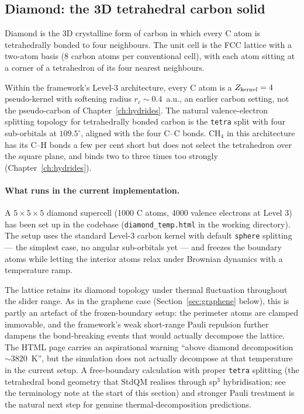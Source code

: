 \subsection{Diamond: the 3D tetrahedral carbon solid}

Diamond is the 3D crystalline form of carbon in which every C atom is tetrahedrally bonded to four neighbours. The unit cell is the FCC lattice with a two-atom basis (8 carbon atoms per conventional cell), with each atom sitting at a corner of a tetrahedron of its four nearest neighbours.

Within the framework's Level-3 architecture, every C atom is a $Z_{\rm kernel} = 4$ pseudo-kernel with softening radius $r_c \sim 0.4$~a.u., an earlier carbon setting, not the pseudo-carbon of Chapter~\ref{ch:hydrides}. The natural valence-electron splitting topology for tetrahedrally bonded carbon is the \texttt{tetra} split with four sub-orbitals at $109.5^\circ$, aligned with the four C--C bonds. CH$_4$ in this architecture has its C--H bonds a few per cent short but does not select the tetrahedron over the square plane, and binds two to three times too strongly (Chapter~\ref{ch:hydrides}).

\paragraph{What runs in the current implementation.}
A $5 \times 5 \times 5$ diamond supercell (1000 C atoms, 4000 valence electrons at Level 3) has been set up in the codebase (\texttt{diamond\_temp.html} in the working directory). The setup uses the standard Level-3 carbon kernel with default \texttt{sphere} splitting --- the simplest case, no angular sub-orbitals yet --- and freezes the boundary atoms while letting the interior atoms relax under Brownian dynamics with a temperature ramp.

The lattice retains its diamond topology under thermal fluctuation throughout the slider range. As in the graphene case (Section~\ref{sec:graphene} below), this is partly an artefact of the frozen-boundary setup: the perimeter atoms are clamped immovable, and the framework's weak short-range Pauli repulsion further dampens the bond-breaking events that would actually decompose the lattice. The HTML page carries an aspirational warning ``above diamond decomposition $\sim 3820$~K'', but the simulation does not actually decompose at that temperature in the current setup. A free-boundary calculation with proper \texttt{tetra} splitting (the tetrahedral bond geometry that StdQM realises through sp$^3$ hybridisation; see the terminology note at the start of this section) and stronger Pauli treatment is the natural next step for genuine thermal-decomposition predictions.

